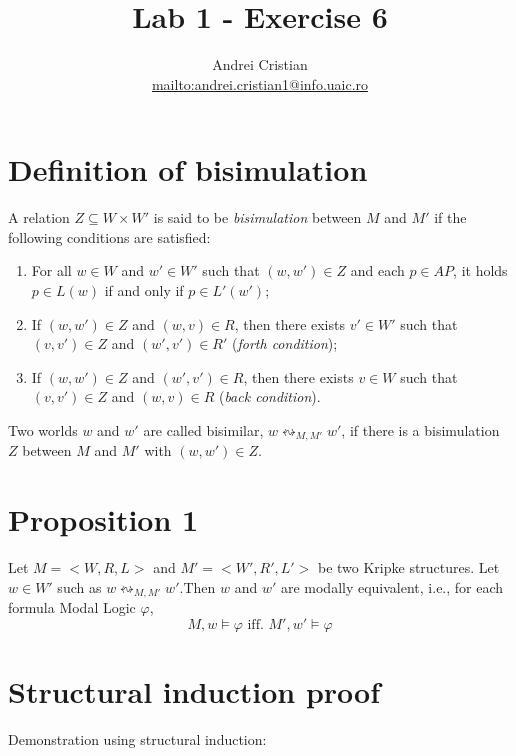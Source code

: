 \documentclass[10pt,a4paper]{article}
\author{Andrei Cristian\\\url{mailto:andrei.cristian1@info.uaic.ro}}
\title{Lab 1 - Exercise 6}
\begin{document}
\maketitle
\section{Definition of bisimulation}
A relation $Z \subseteq W \times W'$ is said to be \textit{bisimulation} between $M$ and $M'$ if the following conditions are satisfied:
\begin{enumerate}
\item For all $w \in W$ and $w' \in W'$ such that $(w, w') \in Z$ and each $p \in AP$, it holds $p \in L(w)$ if and only if $p \in L'(w')$;
\item If $(w, w') \in Z$ and $(w, v) \in R$, then there exists $v' \in W'$ such that $(v, v') \in Z$ and $(w', v') \in R'$ (\textit{forth condition});
\item If $(w, w') \in Z$ and $(w', v') \in R$, then there exists $v \in W$ such that $(v, v') \in Z$ and $(w, v) \in R$ (\textit{back condition}).
\end{enumerate}

Two worlds $w$ and $w'$ are called bisimilar, $w \leftrightsquigarrow_{M, M'} w'$, if there is  a bisimulation $Z$ between $M$ and $M'$ with $(w, w') \in Z$.

\section{Proposition 1}
Let $M = <W, R, L>$ and $M'=<W', R', L'>$ be two Kripke structures. Let $w \in W'$ such as $w \leftrightsquigarrow_{M, M'} w'$.Then $w$ and $w'$ are modally equivalent, i.e., for each formula Modal Logic $\varphi$,
	\[
	M, w \models \varphi \textrm{ iff. } M', w' \models \varphi
	\]
\section{Structural induction proof}

Demonstration using structural induction:
\end{document}

